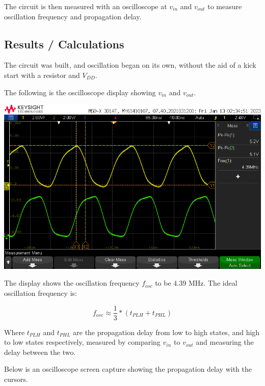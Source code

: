 \documentclass[notitlepage, 12pt]{report}  %
\begin{document}
The circuit is then measured with an oscilloscope at $v_{in}$ and $v_{out}$ to measure oscillation frequency 
and propagation delay.\\

\subsection*{Results / Calculations}

The circuit was built, and oscillation began on its own, without the aid of a kick start with a resistor and $V_{DD}$.

\newpage

The following is the oscilloscope display showing $v_{in}$ and $v_{out}$. 

\begin{center}
    \includegraphics[scale=0.5]{scope5.png}
\end{center}

The display shows the oscillation frequency $f_{osc}$ to be 4.39 MHz. The ideal oscillation frequency is:

\begin{equation}
    f_{osc} \approx \frac{1}{3} * (t_{PLH} + t_{PHL})
\end{equation}

Where $t_{PLH}$ and $t_{PHL}$ are the propagation delay from low to high states, and high to low 
states respectively, measured by comparing $v_{in}$ to $v_{out}$ and measuring the delay between the two.

Below is an oscilloscope screen capture showing the propagation delay with the cursors.
\end{document}
